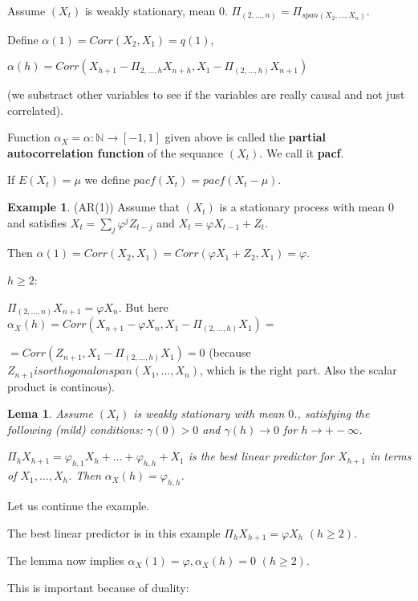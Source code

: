 \documentclass[12pt,a4paper]{amsart}
\theoremstyle{definition} %
\newtheorem{example}[defn]{Example}
\theoremstyle{plain} %
\newtheorem{lema}[defn]{Lema}
\newcommand{\N}{\mathbb N}
\begin{document}
Assume $(X_t)$ is weakly stationary, mean $0$.
$\Pi_{(2, \dots, n)} = \Pi_{span(X_2, \dots, X_n)}$.

Define $\alpha(1) = Corr(X_2, X_1) = q(1)$,

 $\alpha(h) = Corr(X_{h+1} - \Pi_{2, \dots, h} X_{n+h}, X_1 - \Pi_{(2, \dots, h)}X_{n+1})$

(we substract other variables to see if the variables are really causal and not just correlated).

Function $\alpha_X = \alpha: \N \rightarrow [-1,1]$ given above is called the {\bf partial autocorrelation function} of the sequance $(X_t)$. We call it {\bf pacf}.

If $E(X_t )= \mu$ we define $pacf(X_t) = pacf(X_t - \mu)$.

\begin{example} (AR(1))
Assume that $(X_t)$ is a stationary process with mean $0$ and satisfies $X_t = \sum_j \varphi^j Z_{t-j}$ and 
$X_t = \varphi X_{t-1} + Z_t$.

Then $\alpha(1) = Corr(X_2, X_1) = Corr(\varphi X_1 + Z_2, X_1) = \varphi$.

$h \geq 2$:

$\Pi_{(2,\dots,n)}X_{n+1} = \varphi X_n$.
But here $\alpha_X(h) = Corr(X_{n+1} - \varphi X_n, X_1 - \Pi_{(2, \dots,h)}X_1) = $

 $ =  Corr(Z_{n+1}, X_1 - \Pi_{(2, \dots,h)}X_1) = 0$  (because $Z_{n+1} is orthogonal on span(X_1, \dots, X_n)$, which is the right part. Also the scalar product is continous).


\begin{lema}
Assume $(X_t)$ is weakly stationary with mean $0$., satisfying the following (mild) conditions: $\gamma(0) > 0$ and $\gamma(h) \rightarrow 0$ for $h \rightarrow  +- \infty$. 

$\Pi_h X_{h+1} = \varphi_{h,1} X_h + \dots + \varphi_{h,h} + X_1$ is the best linear predictor for $X_{h+1}$ in terms of $X_1, \dots, X_h$. Then
$\alpha_X(h) = \varphi_{h,h}$. 
\end{lema}

Let us continue the example. 

The best linear predictor is in this example 
$\Pi_h X_{h+1} = \varphi X_h$ $(h\geq 2)$.

The lemma now 
implies $\alpha_X(1) = \varphi, \alpha_X(h) = 0$ $(h \geq 2)$.
\end{example}




This is important because of duality:
\end{document}
